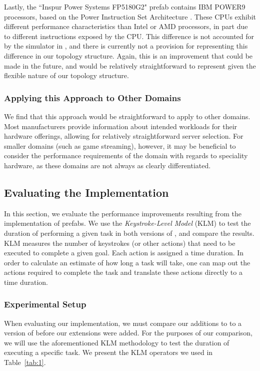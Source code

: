 \documentclass[11pt]{article}
\begin{document}
			Lastly, the ``Inspur Power Systems FP5180G2" prefab contains IBM POWER9 processors, based on the Power Instruction Set Architecture \cite{IBM2017}.
			These CPUs exhibit different performance characteristics than Intel or AMD processors, in part due to different instructions exposed by the CPU.
			This difference is not accounted for by the simulator in \opendc{}, and there is currently not a provision for representing this difference in our topology structure.
			Again, this is an improvement that could be made in the future, and would be relatively straightforward to represent given the flexible nature of our topology structure.


		\subsubsection{Applying this Approach to Other Domains}
			We find that this approach would be straightforward to apply to other domains.
			Most manufacturers provide information about intended workloads for their hardware offerings, allowing for relatively straightforward server selection.
			For smaller domains (such as game streaming), however, it may be beneficial to consider the performance requirements of the domain with regards to speciality hardware, as these domains are not always as clearly differentiated.

	\subsection{Evaluating the Implementation}
		In this section, we evaluate the performance improvements resulting from the implementation of prefabs.
		We use the \textit{Keystroke-Level Model} (KLM) \cite{Newell1980} to test the duration of performing a given task in both versions of \opendc{}, and compare the results.
		KLM measures the number of keystrokes (or other actions) that need to be executed to complete a given goal. 
		Each action is assigned a time duration.
		In order to calculate an estimate of how long a task will take, one can map out the actions required to complete the task and translate these actions directly to a time duration.

		\subsubsection{Experimental Setup}
			When evaluating our implementation, we must compare our additions to \opendc{} to a version of \opendc{} before our extensions were added.
			For the purposes of our comparison, we will use the aforementioned KLM methodology to test the duration of executing a specific task.
			We present the KLM operators we used in Table~\ref{tab:1}.
\end{document}
